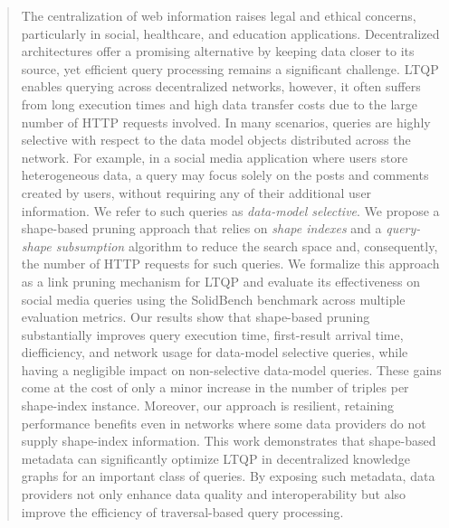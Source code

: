 \begin{abstract}
The centralization of web information raises legal and ethical concerns, particularly in social, healthcare, and education applications.  
Decentralized architectures offer a promising alternative by keeping data closer to its source, yet efficient query processing remains a significant challenge.  
\ac{LTQP} enables querying across decentralized networks, however, it often suffers from long execution times and high data transfer costs due to the large number of \ac{HTTP} requests involved.
In many scenarios, queries are highly selective with respect to the data model objects distributed across the network.
For example, in a social media application where users store heterogeneous data, a query may focus solely on the posts and comments created by users, without requiring any of their additional user information.
We refer to such queries as \emph{data-model selective}.
We propose a shape-based pruning approach that relies on \emph{shape indexes} and a \emph{query-shape subsumption} algorithm to reduce the search space and, consequently, the number of \ac{HTTP} requests for such queries.
We formalize this approach as a link pruning mechanism for \ac{LTQP} and evaluate its effectiveness on social media queries using the SolidBench benchmark across multiple evaluation metrics.
Our results show that shape-based pruning substantially improves query execution time, first-result arrival time, diefficiency, and network usage for data-model selective queries, while having a negligible impact on non-selective data-model queries.  
These gains come at the cost of only a minor increase in the number of triples per shape-index instance.  
Moreover, our approach is resilient, retaining performance benefits even in networks where some data providers do not supply shape-index information.  
This work demonstrates that shape-based metadata can significantly optimize \ac{LTQP} in decentralized knowledge graphs for an important class of queries.
By exposing such metadata, data providers not only enhance data quality and interoperability but also improve the efficiency of traversal-based query processing.  
\end{abstract}
